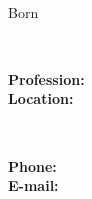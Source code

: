 \documentclass{./../../../../src/latex/classes/resume}
\begin{document}
\iftoggle{Dev}{\par}{}
\noindent\parbox{56mm}
{\parbox{56mm}{\centering\Huge\bfseries\color{cyan}\fullName}\\\parbox{56mm}{\centering Born \bornData}}\parbox{2mm}{\ }\parbox{65mm}
{\textbf{Profession:} \ProfessionI\\\textbf{Location:} \fullAddress}\parbox{2mm}{\ }\parbox{65mm}
{\textbf{Phone:} \mobilePhoneI\\\textbf{E-mail:} \emailI}

\descriptions

\craft

\workExperience

\teaching

\project

\education

\publication

\LicensesCertifications

\honorsAwards

\training
\end{document}
